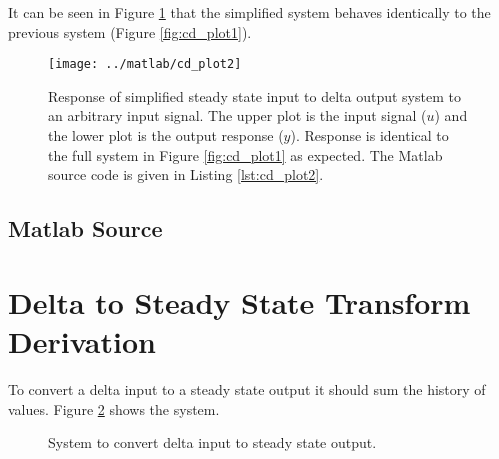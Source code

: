 \documentclass{article}
\begin{document}
It can be seen in Figure \ref{fig:cd_plot2} that the simplified system
behaves identically to the previous system (Figure \ref{fig:cd_plot1}).

\begin{figure}[htbp!]
\texttt{[image: ../matlab/cd\_plot2]}
\caption{Response of simplified steady state input to delta output system
to an arbitrary input signal.
The upper plot is the input signal ($u$) and the lower plot is
the output response ($y$).
Response is identical to the full system in Figure \ref{fig:cd_plot1}
as expected.
The Matlab source code is given in Listing \ref{lst:cd_plot2}.
}
\label{fig:cd_plot2}
\end{figure}

\clearpage
\subsection{Matlab Source}
\label{app:cdsrc}

\nocite{octave}



\clearpage



\clearpage
\section{Delta to Steady State Transform Derivation}
\label{app:dsderiv}

To convert a delta input to a steady state output it should
sum the history of values.
Figure \ref{fig:dc1} shows the system.

\begin{figure}[hpb!]
\begin{center}


\end{center}

\caption{System to convert delta input to steady state output.}
\label{fig:dc1}
\end{figure}
\end{document}
